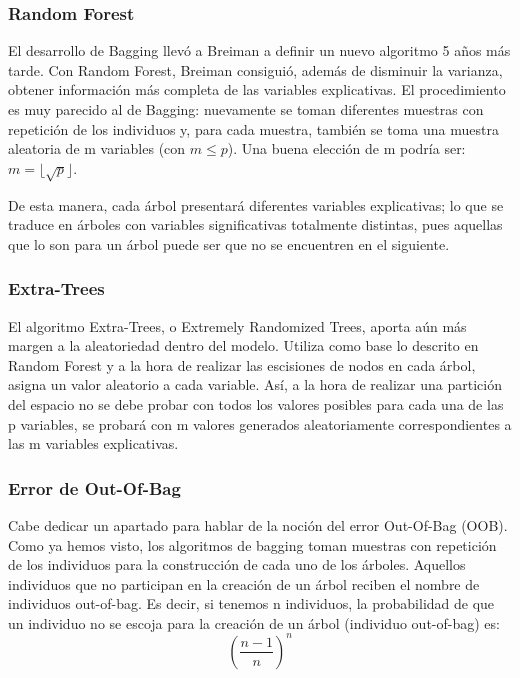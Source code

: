 \documentclass[12pt,twoside]{article}
\begin{document}
\subsubsection{Random Forest}
El desarrollo de Bagging llevó a Breiman a definir un nuevo algoritmo 5 años más tarde. Con Random Forest, Breiman consiguió, además de disminuir la varianza, obtener información más completa de las variables explicativas. El procedimiento es muy parecido al de Bagging: nuevamente se toman diferentes muestras con repetición de los individuos y, para cada muestra, también se toma una muestra aleatoria de m variables (con $m \leq p$). Una buena elección de m podría ser: $ m = \lfloor \sqrt{p} \rfloor$.

De esta manera, cada árbol presentará diferentes variables explicativas; lo que se traduce en árboles con variables significativas totalmente distintas, pues aquellas que lo son para un árbol puede ser que no se encuentren en el siguiente.


\subsubsection{Extra-Trees} \label{sec:ExtraTrees}
El algoritmo Extra-Trees, o Extremely Randomized Trees, aporta aún más margen a la aleatoriedad dentro del modelo. Utiliza como base lo descrito en Random Forest y a la hora de realizar las escisiones de nodos en cada árbol, asigna un valor aleatorio a cada variable. Así, a la hora de realizar una partición del espacio no se debe probar con todos los valores posibles para cada una de las p variables, se probará con m valores generados aleatoriamente correspondientes a las m variables explicativas.


\subsubsection{Error de Out-Of-Bag}
Cabe dedicar un apartado para hablar de la noción del error Out-Of-Bag (OOB). Como ya hemos visto, los algoritmos de bagging toman muestras con repetición de los individuos para la construcción de cada uno de los árboles. Aquellos individuos que no participan en la creación de un árbol reciben el nombre de individuos out-of-bag. Es decir, si tenemos n individuos, la probabilidad de que un individuo no se escoja para la creación de un árbol (individuo out-of-bag) es:
\begin{equation*}
\left( \frac{n-1}{n} \right)^n
\end{equation*}
\end{document}
